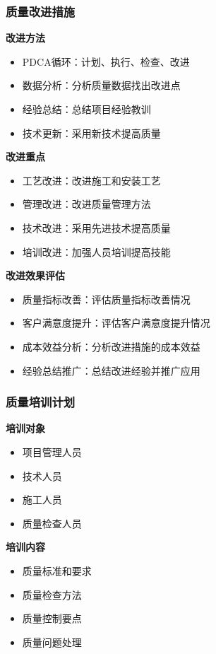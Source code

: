 \documentclass[UTF8,a4paper,zihao=-4]{ctexart}
\begin{document}
\subsubsection{质量改进措施}
\textbf{改进方法}
\begin{itemize}
    \item PDCA循环：计划、执行、检查、改进
    \item 数据分析：分析质量数据找出改进点
    \item 经验总结：总结项目经验教训
    \item 技术更新：采用新技术提高质量
\end{itemize}

\textbf{改进重点}
\begin{itemize}
    \item 工艺改进：改进施工和安装工艺
    \item 管理改进：改进质量管理方法
    \item 技术改进：采用先进技术提高质量
    \item 培训改进：加强人员培训提高技能
\end{itemize}

\textbf{改进效果评估}
\begin{itemize}
    \item 质量指标改善：评估质量指标改善情况
    \item 客户满意度提升：评估客户满意度提升情况
    \item 成本效益分析：分析改进措施的成本效益
    \item 经验总结推广：总结改进经验并推广应用
\end{itemize}

\subsubsection{质量培训计划}
\textbf{培训对象}
\begin{itemize}
    \item 项目管理人员
    \item 技术人员
    \item 施工人员
    \item 质量检查人员
\end{itemize}

\textbf{培训内容}
\begin{itemize}
    \item 质量标准和要求
    \item 质量检查方法
    \item 质量控制要点
    \item 质量问题处理
\end{itemize}
\end{document}
